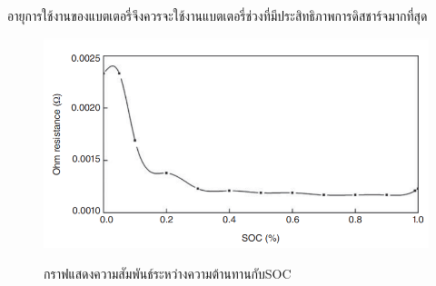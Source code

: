 อายุการใช้งานของแบตเตอรี่จึงควรจะใช้งานแบตเตอรี่ช่วงที่มีประสิทธิภาพการดิสชาร์จมากที่สุด
\begin{center}
	\begin{figure}[H]
		\includegraphics[width=0.6\linewidth]{Chapters/img/Resistance_vs_SOC.png}
			\centering
			\captionsetup{justification=centering,margin=2cm}
			\caption{กราฟแสดงความสัมพันธ์ระหว่างความต้านทานกับSOC}
			\cite{jiangzhang2015}
	\end{figure}
\end{center}
